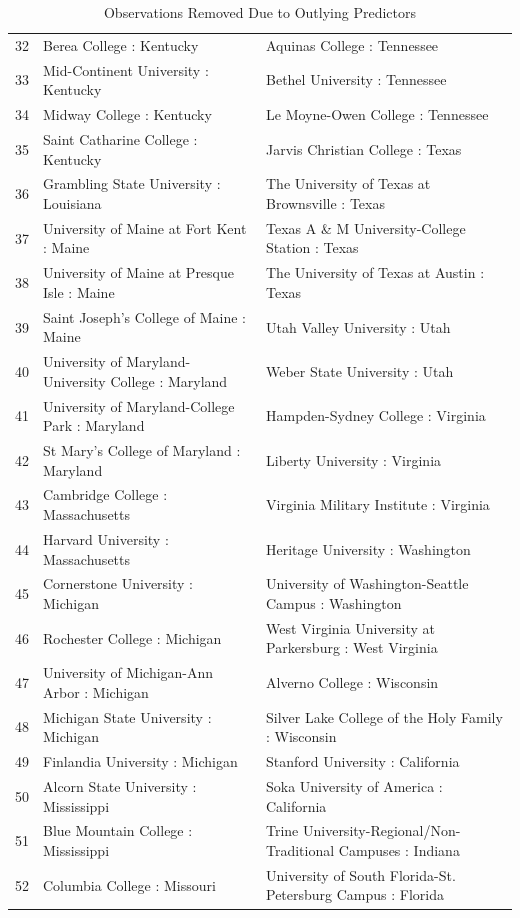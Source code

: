 \documentclass{article}
\begin{document}
\begin{Schunk}
\begin{table}[ht]
\begin{tabular}{rll}
  32 & Berea College : Kentucky & Aquinas College : Tennessee \\ 
  33 & Mid-Continent University : Kentucky & Bethel University : Tennessee \\ 
  34 & Midway College : Kentucky & Le Moyne-Owen College : Tennessee \\ 
  35 & Saint Catharine College : Kentucky & Jarvis Christian College : Texas \\ 
  36 & Grambling State University : Louisiana & The University of Texas at Brownsville : Texas \\ 
  37 & University of Maine at Fort Kent : Maine & Texas A \& M University-College Station : Texas \\ 
  38 & University of Maine at Presque Isle : Maine & The University of Texas at Austin : Texas \\ 
  39 & Saint Joseph's College of Maine : Maine & Utah Valley University : Utah \\ 
  40 & University of Maryland-University College : Maryland & Weber State University : Utah \\ 
  41 & University of Maryland-College Park : Maryland & Hampden-Sydney College : Virginia \\ 
  42 & St Mary's College of Maryland : Maryland & Liberty University : Virginia \\ 
  43 & Cambridge College : Massachusetts & Virginia Military Institute : Virginia \\ 
  44 & Harvard University : Massachusetts & Heritage University : Washington \\ 
  45 & Cornerstone University : Michigan & University of Washington-Seattle Campus : Washington \\ 
  46 & Rochester College : Michigan & West Virginia University at Parkersburg : West Virginia \\ 
  47 & University of Michigan-Ann Arbor : Michigan & Alverno College : Wisconsin \\ 
  48 & Michigan State University : Michigan & Silver Lake College of the Holy Family : Wisconsin \\ 
  49 & Finlandia University : Michigan & Stanford University : California \\ 
  50 & Alcorn State University : Mississippi & Soka University of America : California \\ 
  51 & Blue Mountain College : Mississippi & Trine University-Regional/Non-Traditional Campuses : Indiana \\ 
  52 & Columbia College : Missouri & University of South Florida-St. Petersburg Campus : Florida \\ 
   \hline
\end{tabular}
\caption{Observations Removed Due to Outlying Predictors} 
\end{table}\end{Schunk}
\end{document}

